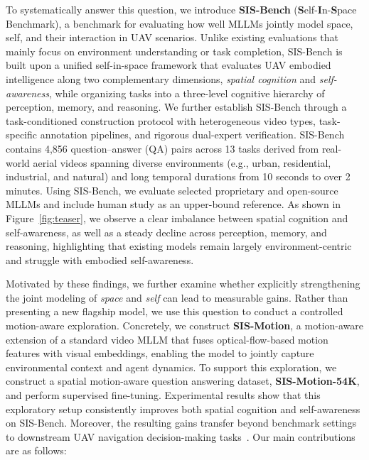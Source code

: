 \documentclass[sigconf, screen, review, anonymous]{acmart}
\begin{document}
To systematically answer this question, we introduce \textbf{SIS-Bench} (\textbf{S}elf-\textbf{I}n-\textbf{S}pace Benchmark), a benchmark for evaluating how well MLLMs jointly model space, self, and their interaction in UAV scenarios. Unlike existing evaluations that mainly focus on environment understanding or task completion, SIS-Bench is built upon a unified self-in-space framework that evaluates UAV embodied intelligence along two complementary dimensions, \emph{spatial cognition} and \emph{self-awareness}, while organizing tasks into a three-level cognitive hierarchy of perception, memory, and reasoning. We further establish SIS-Bench through a task-conditioned construction protocol with heterogeneous video types, task-specific annotation pipelines, and rigorous dual-expert verification.
SIS-Bench contains 4,856 question--answer (QA) pairs across 13 tasks derived from real-world aerial videos spanning diverse environments (e.g., urban, residential, industrial, and natural) and long temporal durations from 10 seconds to over 2 minutes.
Using SIS-Bench, we evaluate selected proprietary and open-source MLLMs and include human study as an upper-bound reference. As shown in Figure~\ref{fig:teaser}, we observe a clear imbalance between spatial cognition and self-awareness, as well as a steady decline across perception, memory, and reasoning, highlighting that existing models remain largely environment-centric and struggle with embodied self-awareness.

Motivated by these findings, we further examine whether explicitly strengthening the joint modeling of \emph{space} and \emph{self} can lead to measurable gains. Rather than presenting a new flagship model, we use this question to conduct a controlled motion-aware exploration. Concretely, we construct \textbf{SIS-Motion}, a motion-aware extension of a standard video MLLM that fuses optical-flow-based motion features with visual embeddings, enabling the model to jointly capture environmental context and agent dynamics. To support this exploration, we construct a spatial motion-aware question answering dataset, \textbf{SIS-Motion-54K}, and perform supervised fine-tuning. Experimental results show that this exploratory setup consistently improves both spatial cognition and self-awareness on SIS-Bench. Moreover, the resulting gains transfer beyond benchmark settings to downstream UAV navigation decision-making tasks~\cite{anderson2018vision,fried2018speaker,irshad2021hierarchical}. Our main contributions are as follows:
\end{document}
